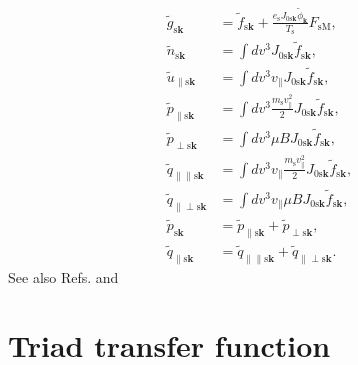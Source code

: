 \begin{align}
  \tilde{g}_{\mathrm{s}\bm{k}} &= \tilde{f}_{\mathrm{s}\bm{k}} + \frac{e_\mathrm{s} J_{0\mathrm{s}\bm{k}} \tilde{\phi}_{\bm{k}}}{T_\mathrm{s}} F_\mathrm{sM}, \\
  \tilde{n}_{\mathrm{s}\bm{k}} &= \int dv^3 J_{0\mathrm{s}\bm{k}} \tilde{f}_{\mathrm{s}\bm{k}}, \\
  \tilde{u}_{\parallel\mathrm{s}\bm{k}} &= \int dv^3 v_\parallel J_{0\mathrm{s}\bm{k}} \tilde{f}_{\mathrm{s}\bm{k}}, \\
  \tilde{p}_{\parallel\mathrm{s}\bm{k}} &= \int dv^3 \frac{m_\mathrm{s}v_\parallel^2}{2} J_{0\mathrm{s}\bm{k}} \tilde{f}_{\mathrm{s}\bm{k}}, \\
  \tilde{p}_{\perp\mathrm{s}\bm{k}} &= \int dv^3 \mu B J_{0\mathrm{s}\bm{k}} \tilde{f}_{\mathrm{s}\bm{k}}, \\
  \tilde{q}_{\parallel\parallel\mathrm{s}\bm{k}} &= \int dv^3 v_\parallel \frac{m_\mathrm{s}v_\parallel^2}{2} J_{0\mathrm{s}\bm{k}} \tilde{f}_{\mathrm{s}\bm{k}}, \\
  \tilde{q}_{\parallel\perp\mathrm{s}\bm{k}} &= \int dv^3 v_\parallel \mu B J_{0\mathrm{s}\bm{k}} \tilde{f}_{\mathrm{s}\bm{k}}, \\
  \tilde{p}_{\mathrm{s}\bm{k}} &= \tilde{p}_{\parallel\mathrm{s}\bm{k}} + \tilde{p}_{\perp\mathrm{s}\bm{k}} , \\
  \tilde{q}_{\parallel\mathrm{s}\bm{k}} &= \tilde{q}_{\parallel\parallel\mathrm{s}\bm{k}} + \tilde{q}_{\parallel\perp\mathrm{s}\bm{k}}.
\end{align}
See also Refs. \cite{Sugama2009PoP} and \cite{Maeyama2014PoP}





\section{Triad transfer function}
\label{sec:Triad transfer function}

